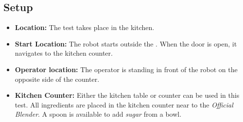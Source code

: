 \subsection*{Setup}
\begin{itemize}[nosep]
	\item \textbf{Location:} The test takes place in the kitchen.

	\item \textbf{Start Location:} The robot starts outside the \Arena{}.
	When the door is open, it navigates to the kitchen counter.

	\item \textbf{Operator location:} The operator is standing in front of the robot on the opposite side of the counter.

	\item \textbf{Kitchen Counter:} Either the kitchen table or counter can be used in this test.
	All ingredients are placed in the kitchen counter near to the \emph{Official Blender}.
	A spoon is available to add \emph{sugar} from a bowl.

\end{itemize}

